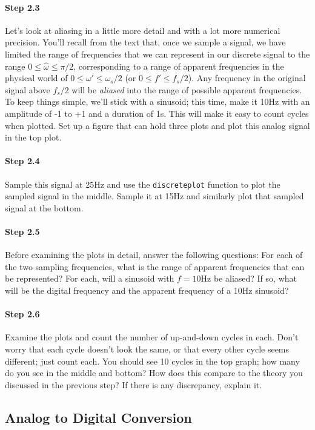 \paragraph{Step 2.3} Let's look at aliasing in a little more detail
and with a lot more numerical precision. You'll recall from the text
that, once we sample a signal, we have limited the range of
frequencies that we can represent in our discrete signal to the range
$0 \leq \hat{\omega} \leq \pi/2$, corresponding to a range of apparent
frequencies in the physical world of $0 \leq \omega' \leq \omega_s/2$
(or $0 \leq f' \leq f_s/2$). Any frequency in the original signal
above $f_s/2$ will be \emph{aliased} into the range of possible
apparent frequencies. To keep things simple, we'll stick with a
sinusoid; this time, make it 10Hz with an amplitude of -1 to +1 and a
duration of 1s. This will make it easy to count cycles when
plotted. Set up a figure that can hold three plots and plot this
analog signal in the top plot.

\paragraph{Step 2.4} Sample this signal at 25Hz and use the
\texttt{discreteplot} function to plot the sampled signal in the
middle. Sample it at 15Hz and similarly plot that sampled signal at
the bottom.

\paragraph{Step 2.5} Before examining the plots in detail, answer the
following questions: For each of the two sampling frequencies, what is
the range of apparent frequencies that can be represented? For each,
will a sinusoid with $f = 10$Hz be aliased? If so, what will be the
digital frequency and the apparent frequency of a 10Hz sinusoid?

\paragraph{Step 2.6} Examine the plots and count the number of
up-and-down cycles in each. Don't worry that each cycle doesn't look
the same, or that every other cycle seems different; just count
each. You should see 10 cycles in the top graph; how many do you see
in the middle and bottom? How does this compare to the theory you
discussed in the previous step? If there is any discrepancy, explain it.


\subsection{Analog to Digital Conversion}

